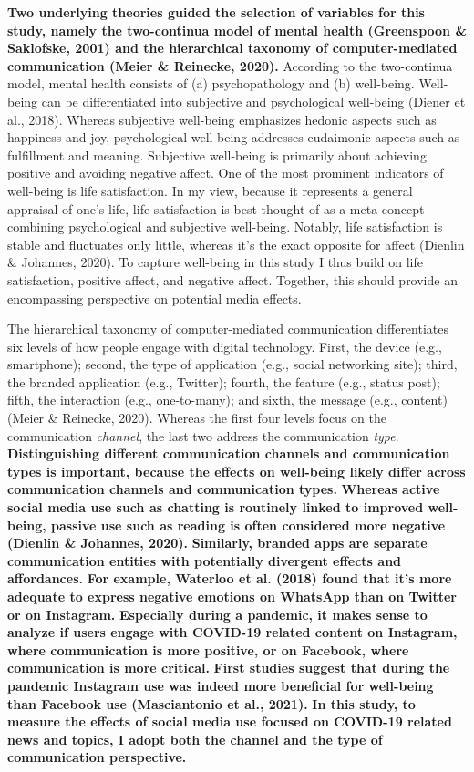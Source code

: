 \documentclass[
  man,mask]{apa7}
\begin{document}
\textbf{Two underlying theories guided the selection of variables for this study, namely the two-continua model of mental health (Greenspoon \& Saklofske, 2001) and the hierarchical taxonomy of computer-mediated communication (Meier \& Reinecke, 2020).}
According to the two-continua model, mental health consists of (a) psychopathology and (b) well-being.
Well-being can be differentiated into subjective and psychological well-being (Diener et al., 2018).
Whereas subjective well-being emphasizes hedonic aspects such as happiness and joy, psychological well-being addresses eudaimonic aspects such as fulfillment and meaning.
Subjective well-being is primarily about achieving positive and avoiding negative affect.
One of the most prominent indicators of well-being is life satisfaction.
In my view, because it represents a general appraisal of one's life, life satisfaction is best thought of as a meta concept combining psychological and subjective well-being.
Notably, life satisfaction is stable and fluctuates only little, whereas it's the exact opposite for affect (Dienlin \& Johannes, 2020).
To capture well-being in this study I thus build on life satisfaction, positive affect, and negative affect.
Together, this should provide an encompassing perspective on potential media effects.

The hierarchical taxonomy of computer-mediated communication differentiates six levels of how people engage with digital technology.
First, the device (e.g., smartphone); second, the type of application (e.g., social networking site); third, the branded application (e.g., Twitter); fourth, the feature (e.g., status post); fifth, the interaction (e.g., one-to-many); and sixth, the message (e.g., content) (Meier \& Reinecke, 2020).
Whereas the first four levels focus on the communication \emph{channel}, the last two address the communication \emph{type}.
\textbf{Distinguishing different communication channels and communication types is important, because the effects on well-being likely differ across communication channels and communication types.}
\textbf{Whereas active social media use such as chatting is routinely linked to improved well-being, passive use such as reading is often considered more negative (Dienlin \& Johannes, 2020).}
\textbf{Similarly, branded apps are separate communication entities with potentially divergent effects and affordances.}
\textbf{For example, Waterloo et al. (2018) found that it's more adequate to express negative emotions on WhatsApp than on Twitter or on Instagram.}
\textbf{Especially during a pandemic, it makes sense to analyze if users engage with COVID-19 related content on Instagram, where communication is more positive, or on Facebook, where communication is more critical.}
\textbf{First studies suggest that during the pandemic Instagram use was indeed more beneficial for well-being than Facebook use (Masciantonio et al., 2021).}
\textbf{In this study, to measure the effects of social media use focused on COVID-19 related news and topics, I adopt both the channel and the type of communication perspective.}
\end{document}
